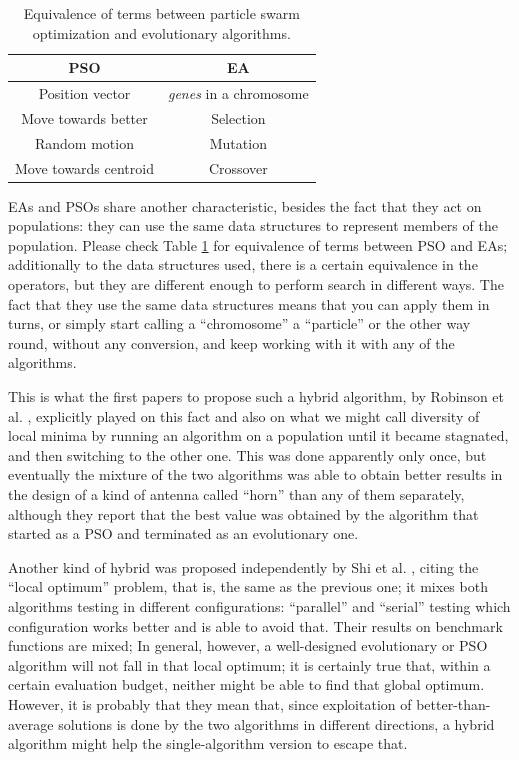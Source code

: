 \documentclass[runningheads]{llncs}
\begin{document}
\begin{table}[h!tb]
    \caption{Equivalence of terms between particle swarm optimization
    and evolutionary algorithms. \label{tab:equivalence}}
\centering
\begin{tabular}{|c|c|}
  \hline
  PSO & EA \\ \hline
  Position vector & {\em genes} in a chromosome \\ \hline
  Move towards better & Selection  \\ \hline
  Random motion & Mutation \\ \hline
  Move towards centroid & Crossover \\ \hline
\end{tabular}
\end{table}
%
EAs and PSOs share another characteristic, besides the fact that they
act on populations: they can use the same data structures to
represent  members of the population. Please check Table
\ref{tab:equivalence} for equivalence of terms between PSO and EAs;
additionally to the data structures used, there is a certain
equivalence in the operators, but they are different enough to perform
search in different ways. The fact that they use the same data
structures means that you can apply them in turns, or simply start
calling a ``chromosome'' a ``particle'' or the other way round,
without any conversion, and keep working with it with any of the algorithms.

This is what the first papers to propose such a hybrid algorithm, by
Robinson et al. \cite{Robinson2002}, explicitly played on this
fact and also on what we might call diversity of local minima by
running an algorithm on a population until it became stagnated, and
then switching to the other one. This was done apparently only once,
but eventually the mixture of the two algorithms was able to obtain
better results in the design of a kind of antenna called ``horn'' than
any of them separately, although they report that the best value
was obtained by the algorithm that started as a PSO and terminated as
an evolutionary one.

Another kind of hybrid was proposed independently by 
Shi et al. \cite{shi2003hybrid}, citing the ``local optimum'' problem,
that is, the same as the previous one; it mixes both algorithms
testing in different configurations: ``parallel'' and ``serial''
testing which configuration works better and is able to avoid
that. Their results on benchmark functions are mixed;
In general, however, a well-designed evolutionary or PSO
algorithm will not fall in that local optimum; it is certainly true
that, within a certain evaluation budget, neither might be able to
find that global optimum. However, it is probably that they mean that,
since exploitation of better-than-average solutions is done by the two
algorithms in different directions, a hybrid algorithm might help the
single-algorithm version to escape that.
\end{document}
